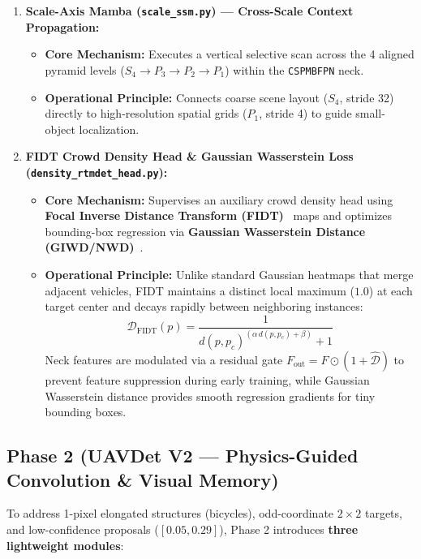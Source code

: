 \documentclass[11pt,a4paper]{article}
\begin{document}
\begin{enumerate}[leftmargin=1.6em]
    \item \textbf{Scale-Axis Mamba (\texttt{scale\_ssm.py}) --- Cross-Scale Context Propagation:}
    \begin{itemize}[leftmargin=1.2em]
        \item \textbf{Core Mechanism:} Executes a vertical selective scan across the 4 aligned pyramid levels ($S_4 \rightarrow P_3 \rightarrow P_2 \rightarrow P_1$) within the \texttt{CSPMBFPN} neck.
        \item \textbf{Operational Principle:} Connects coarse scene layout ($S_4$, stride 32) directly to high-resolution spatial grids ($P_1$, stride 4) to guide small-object localization.
    \end{itemize}

    \item \textbf{FIDT Crowd Density Head \& Gaussian Wasserstein Loss (\texttt{density\_rtmdet\_head.py}):}
    \begin{itemize}[leftmargin=1.2em]
        \item \textbf{Core Mechanism:} Supervises an auxiliary crowd density head using \textbf{Focal Inverse Distance Transform (FIDT)}~\cite{liang2022fidt} maps and optimizes bounding-box regression via \textbf{Gaussian Wasserstein Distance (GIWD/NWD)}~\cite{wang2021nwd}.
        \item \textbf{Operational Principle:} Unlike standard Gaussian heatmaps that merge adjacent vehicles, FIDT maintains a distinct local maximum ($1.0$) at each target center and decays rapidly between neighboring instances:
        \begin{equation}
            \mathcal{D}_{\text{FIDT}}(p) = \frac{1}{d(p, p_c)^{\left(\alpha\, d(p, p_c) + \beta\right)} + 1}
            \label{eq:fidt}
        \end{equation}
        Neck features are modulated via a residual gate $F_{\text{out}} = F \odot (1 + \hat{\mathcal{D}})$ to prevent feature suppression during early training, while Gaussian Wasserstein distance provides smooth regression gradients for tiny bounding boxes.
    \end{itemize}
\end{enumerate}

\subsection{Phase 2 (UAVDet V2 --- Physics-Guided Convolution \& Visual Memory)}

To address 1-pixel elongated structures (bicycles), odd-coordinate $2\times 2$ targets, and low-confidence proposals ($[0.05, 0.29]$), Phase 2 introduces \textbf{three lightweight modules}:
\end{document}
